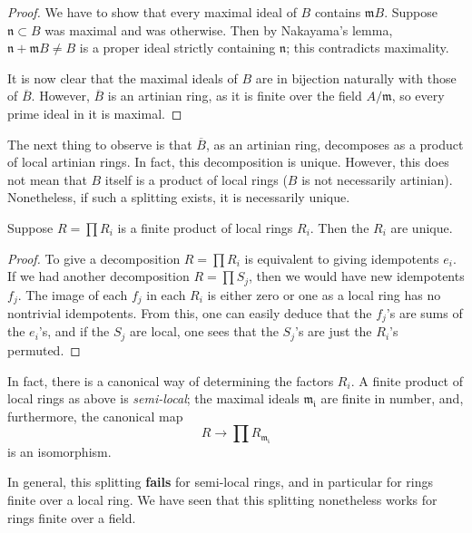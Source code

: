 \begin{proof} 
We have to show that every maximal ideal of $B$ contains $\mathfrak{m}
B$. Suppose $\mathfrak{n} \subset B$ was maximal and was otherwise.
Then by Nakayama's lemma, $\mathfrak{n} + \mathfrak{m} B \neq B$ is a
proper ideal strictly containing $\mathfrak{n}$; this contradicts
maximality.

It is now clear that the maximal ideals of $B$ are in bijection
naturally with those of $\overline{B}$. 
However, $\overline{B}$ is an artinian ring, as it is finite over the
field $A/\mathfrak{m}$, so every prime ideal in it is maximal.
\end{proof}



The next thing to observe is that $\overline{B}$, as an artinian ring,
decomposes  as a product of local artinian rings.
In fact, this decomposition is unique.
However, this does not mean that $B$ itself 
is a product of local rings ($B$ is not necessarily artinian).
Nonetheless, if such a splitting exists, it is necessarily unique.

\begin{proposition} 
Suppose $R = \prod R_i$ is a finite product of local rings $R_i$. Then
the $R_i$ are unique.
\end{proposition}
\begin{proof} 
To give a decomposition $R = \prod R_i$ is equivalent to giving
idempotents $e_i$. If we had another decomposition $R = \prod S_j$,
then we would have new idempotents $f_j$. The image of each $f_j$ in
each $R_i$ is either zero or one as a local ring has no nontrivial
idempotents. From this, one can easily deduce that the $f_j$'s are
sums of the $e_i$'s, and if the $S_j$ are local, one sees that the
$S_j$'s are just the $R_i$'s permuted. 
\end{proof}

In fact, there is a canonical way of determining the factors $R_i$. 
A finite product of local rings as above is \textit{semi-local}; 
the maximal ideals $\mathfrak{m_i}$ are finite in number, and, furthermore, the
canonical map
\[ R \to \prod R_{\mathfrak{m_i}} \]
is an isomorphism.


In general, this splitting \textbf{fails} for semi-local rings, and in
particular for rings finite over a local ring.
We have seen that this splitting nonetheless works for rings finite
over a field.


